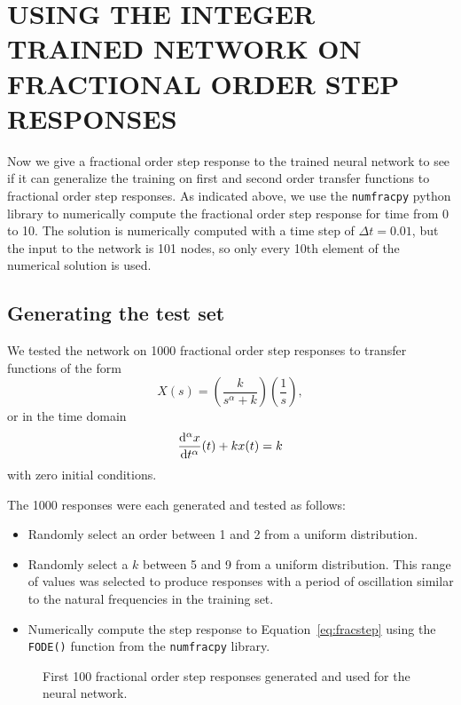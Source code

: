 \section{USING THE INTEGER TRAINED NETWORK ON FRACTIONAL ORDER STEP RESPONSES}
\label{sec:generalize}

Now we give a fractional order step response to the trained neural network to
see if it can generalize the training on first and second order transfer
functions to fractional order step responses. As indicated above, we use the
\texttt{numfracpy} python library to numerically compute the fractional order
step response for time from 0 to 10. The solution is numerically computed with a
time step of $\Delta t = 0.01$, but the input to the network is 101 nodes, so
only every 10th element of the numerical solution is used.

\subsection{Generating the test set}
We tested the network on 1000 fractional order step responses to transfer
functions of the form
\[
  X(s) = \left( \frac{k}{s^\alpha + k} \right) \left( \frac{1}{s} \right),
\]
or in the time domain
\begin{equation}
\frac{\mathrm{d}^\alpha x}{\mathrm{d} t^\alpha}(t) + k x(t) = k
\label{eq:fracstep}
\end{equation}
with zero initial conditions. 

The 1000 responses were each generated and tested as follows: 
\begin{itemize}
\item Randomly select an order between 1 and 2 from a uniform distribution.
\item Randomly select a $k$ between 5 and 9 from a uniform distribution. This
  range of values was selected to produce responses with a period of oscillation
  similar to the natural frequencies in the training set.
\item Numerically compute the step response to Equation~\ref{eq:fracstep} using
the \texttt{FODE()} function from the \texttt{numfracpy} library. 
\end{itemize}

\begin{figure}
\centering

\vspace*{-5pt}
\caption{First 100 fractional order step responses generated and used for the
neural network.}
\label{fig:accuracy}
\end{figure}

